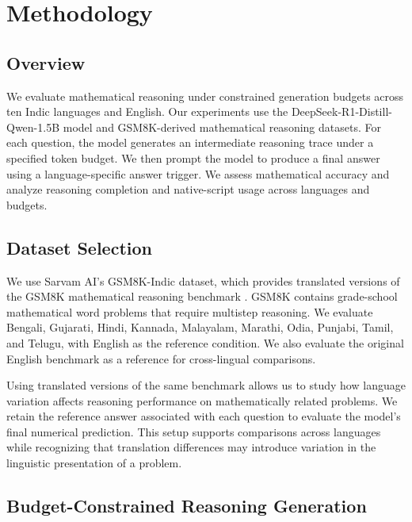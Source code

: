 \documentclass[11pt]{article}
\begin{document}
\section{Methodology}
\label{sec:method}

\subsection{Overview}
\label{sec:method_overview}

We evaluate mathematical reasoning under constrained generation budgets across ten Indic languages and English. Our experiments use the DeepSeek-R1-Distill-Qwen-1.5B model and GSM8K-derived mathematical reasoning datasets. For each question, the model generates an intermediate reasoning trace under a specified token budget. We then prompt the model to produce a final answer using a language-specific answer trigger. We assess mathematical accuracy and analyze reasoning completion and native-script usage across languages and budgets.

\subsection{Dataset Selection}
\label{sec:method_dataset}

We use Sarvam AI's GSM8K-Indic dataset, which provides translated versions of the GSM8K mathematical reasoning benchmark \citep{sarvam_gsm8k_indic, cobbe2021gsm8k}. GSM8K contains grade-school mathematical word problems that require multistep reasoning. We evaluate Bengali, Gujarati, Hindi, Kannada, Malayalam, Marathi, Odia, Punjabi, Tamil, and Telugu, with English as the reference condition. We also evaluate the original English benchmark as a reference for cross-lingual comparisons.

Using translated versions of the same benchmark allows us to study how language variation affects reasoning performance on mathematically related problems. We retain the reference answer associated with each question to evaluate the model's final numerical prediction. This setup supports comparisons across languages while recognizing that translation differences may introduce variation in the linguistic presentation of a problem.

\subsection{Budget-Constrained Reasoning Generation}
\label{sec:method_generation}
\end{document}
